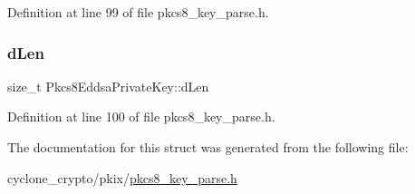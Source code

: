 Definition at line 99 of file pkcs8\+\_\+key\+\_\+parse.\+h.

\mbox{\label{structPkcs8EddsaPrivateKey_a5806438d23d571cf0f83c4a6e2f83f98}} 
\subsubsection{\texorpdfstring{d\+Len}{dLen}}
{\footnotesize\ttfamily size\+\_\+t Pkcs8\+Eddsa\+Private\+Key\+::d\+Len}



Definition at line 100 of file pkcs8\+\_\+key\+\_\+parse.\+h.



The documentation for this struct was generated from the following file\+:\begin{DoxyCompactItemize}
\item 
cyclone\+\_\+crypto/pkix/\hyperlink{pkcs8__key__parse_8h}{pkcs8\+\_\+key\+\_\+parse.\+h}\end{DoxyCompactItemize}
